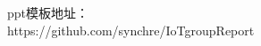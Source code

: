 \documentclass[16pt]{beamer}	%
\begin{document}
\begin{frame}
\Large  ppt模板地址：
\\ https://github.com/synchre/IoTgroupReport
\end{frame}

\begin{frame}
\end{frame}

	
		
		
\end{document}
